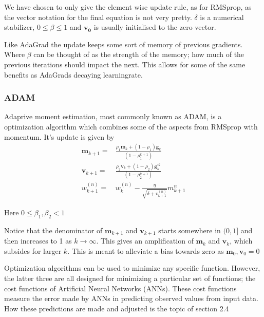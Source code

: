 \documentclass{article}
\theoremstyle{definition}
\begin{document}
 We have chosen to only give the element wise update rule, as for RMSprop, as the vector notation for the final equation is not very pretty. $\delta$ is a numerical stabilizer, $0\leq \beta \leq 1$ and $\mathbf{v_0}$ is usually initialised to the zero vector.
\par
\vspace{1mm}
Like AdaGrad the update keeps some sort of memory of previous gradients. Where $\beta$ can be thought of as the strength of the memory; how much of the previous iterations should impact the next. This allows for some of the same benefits as AdaGrads decaying learningrate.

\subsubsection{ADAM}
Adaprive moment estimation, most commonly known as ADAM, is a optimization algorithm which combines some of the aspects from RMSprop with momentum. It's update is given by
\begin{align*}
    \mathbf{m}_{k+1} =& \frac{\rho_1 \mathbf{m}_k + (1- \rho_1) \mathbf{g}_k}{\left(1 - \rho_1^{k+1}\right)}\\
    \mathbf{v}_{k+1} =& \frac{\rho_2 \mathbf{v}_k + (1-\rho_2) \mathbf{g}_k^{\circ 2}}{\left(1-\rho_2^{k+1}\right)}\\
    w_{k+1}^{(n)} =& w_k^{(n)} - \frac{\eta}{ \sqrt{\delta+v_{k+1}^{(n)}}} m_{k+1}^{n}
\end{align*}

Here $0 \leq \beta_1,\beta_2 < 1$ 
\par
\vspace{1mm}
Notice that the denominator of $\mathbf{m}_{k+1}$ and $\mathbf{v}_{k+1}$ starts somewhere in $(0,1]$ and then increases to 1 as $k \to \infty$. This gives an amplification of $\mathbf{m}_k$ and $\mathbf{v}_k$, which subsides for larger $k$. This is meant to alleviate a bias towards zero as  $\mathbf{m}_0, \mathbf{v}_0 = 0$ \parencite[Section 3]{kingma2014adam}

\vspace{2mm}
Optimization algorithms can be used to minimize any specific function. However, the latter three are all designed for minimizing a particular set of functions; the cost functions of Artificial Neural Networks (ANNs). These cost functions measure the error made by ANNs in predicting observed values from input data. How these predictions are made and adjusted is the topic of section 2.4
\end{document}
